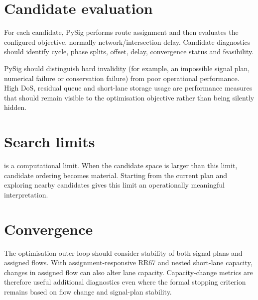 \section{Candidate evaluation}
For each candidate, PySig performs route assignment and then evaluates the configured
objective, normally network/intersection delay.  Candidate diagnostics should identify
cycle, phase splits, offset, delay, convergence status and feasibility.

PySig should distinguish hard invalidity (for example, an impossible signal plan,
numerical failure or conservation failure) from poor operational performance.  High
DoS, residual queue and short-lane storage usage are performance measures that should
remain visible to the optimisation objective rather than being silently hidden.

\section{Search limits}
 is a computational limit.  When the candidate
space is larger than this limit, candidate ordering becomes material.  Starting from
the current plan and exploring nearby candidates gives this limit an operationally
meaningful interpretation.

\section{Convergence}
The optimisation outer loop should consider stability of both signal plans and assigned
flows.  With assignment-responsive RR67 and nested short-lane capacity, changes in
assigned flow can also alter lane capacity.  Capacity-change metrics are therefore
useful additional diagnostics even where the formal stopping criterion remains based on
flow change and signal-plan stability.
